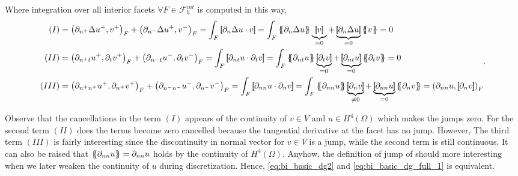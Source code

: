 Where integration over all interior facets $ \forall F \in \mathcal{F}_{h}^{int}$ is computed in this way,
\begin{equation*}
    \begin{split}
        (I) &  =    \left(\partial _{n^{+}} \Delta  u^{+} ,v^{+}\right)_{F} +
        \left(\partial _{n^{-}} \Delta  u^{+} ,v^{-}\right)_{F} =   \int_{F}^{}
        \jump{ \partial _{n} \Delta  u \cdot v } =
         \int_{F}^{}
         \mean{ \partial _{n} \Delta  u } \underbrace{\jump{ v }}_{= 0}    + \underbrace{\jump{ \partial _{n} \Delta  u
         }}_{= 0}    \mean{ v } = 0 \\
        (II) &  =     \left(\partial _{n^{+}t} u^{+}, \partial_{t} v^{+}
        \right)_{F} +  \left(\partial _{n^{-}t} u^{-}, \partial_{t} v^{-}
\right)_{F}    =   \int_{F}^{}
        \jump{ \partial _{nt} u \cdot  \partial_{t} v } =
         \int_{F}^{}
         \mean{ \partial _{nt} u    } \underbrace{\jump{ \partial_{t} v }  }_{= 0}    + \underbrace{\jump{ \partial
                 _{nt}  u
         }}_{= 0}    \mean{ \partial _{t}v }  = 0\\
        (III) &  =     \left(\partial _{n^{+}n^{+}} u^{+}, \partial_{n^{+}} v^{+} \right)_{F} +  \left(\partial _{n^{-}n^{-}} u^{-}, \partial_{n^{-}} v^{-} \right)_{F}    =    \int_{F}^{} \jump{ \partial _{nn} u \cdot  \partial_{n} v } = \int_{F}^{}
        \mean{ \partial _{nn} u    } \underbrace{\jump{ \partial_{n} v }  }_{\neq 0}    + \underbrace{\jump{ \partial
                 _{nn}  u
         }}_{= 0}    \mean{ \partial _{n}v }  =  \left( \partial _{nn} u, \jump{ \partial_{n} v } \right)_{F}   \end{split}
.\end{equation*}

Observe that the cancellations in the term $(I)$ appears of the continuity of $v\in V $ and $u\in H^{4}\left( \Omega  \right) $ which makes the jumps zero. For the second term $(II)$ does the terms become zero cancelled because the tangential
derivative at the facet has no jump. However, The third term $(III)$  is fairly interesting since the discontinuity in normal vector for $v \in V$ is a jump, while the second term is still continuous. It can also be raised that $\left\{\!\!\left\{ \partial _{nn} u \right\}\!\!\right\} = \partial _{nn} u  $ holds by the continuity of $H^{4}\left( \Omega  \right) $. Anyhow, the definition of jump of should more interesting when we later weaken the continuity of $u$ during discretization.
Hence, \eqref{eq:bi_basic_dg2} and \eqref{eq:bi_basic_dg_full_1} is equivalent.

